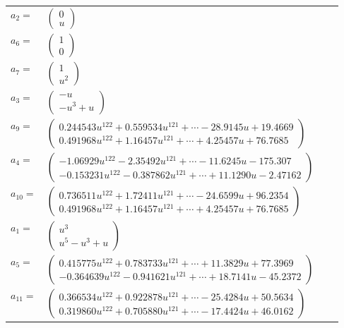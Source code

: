 \documentclass[1p]{elsarticle_modified}
\theoremstyle{definition}
\begin{document}
\begin{tabular}{m{7pt} m{180pt} m{7pt} m{180pt} }
\flushright $a_{2}=$&$\begin{pmatrix}0\\u\end{pmatrix}$ \\
\flushright $a_{6}=$&$\begin{pmatrix}1\\0\end{pmatrix}$ \\
\flushright $a_{7}=$&$\begin{pmatrix}1\\u^2\end{pmatrix}$ \\
\flushright $a_{3}=$&$\begin{pmatrix}- u\\- u^3+u\end{pmatrix}$ \\
\flushright $a_{9}=$&$\begin{pmatrix}0.244543 u^{122}+0.559534 u^{121}+\cdots-28.9145 u+19.4669\\0.491968 u^{122}+1.16457 u^{121}+\cdots+4.25457 u+76.7685\end{pmatrix}$ \\
\flushright $a_{4}=$&$\begin{pmatrix}-1.06929 u^{122}-2.35492 u^{121}+\cdots-11.6245 u-175.307\\-0.153231 u^{122}-0.387862 u^{121}+\cdots+11.1290 u-2.47162\end{pmatrix}$ \\
\flushright $a_{10}=$&$\begin{pmatrix}0.736511 u^{122}+1.72411 u^{121}+\cdots-24.6599 u+96.2354\\0.491968 u^{122}+1.16457 u^{121}+\cdots+4.25457 u+76.7685\end{pmatrix}$ \\
\flushright $a_{1}=$&$\begin{pmatrix}u^3\\u^5- u^3+u\end{pmatrix}$ \\
\flushright $a_{5}=$&$\begin{pmatrix}0.415775 u^{122}+0.783733 u^{121}+\cdots+11.3829 u+77.3969\\-0.364639 u^{122}-0.941621 u^{121}+\cdots+18.7141 u-45.2372\end{pmatrix}$ \\
\flushright $a_{11}=$&$\begin{pmatrix}0.366534 u^{122}+0.922878 u^{121}+\cdots-25.4284 u+50.5634\\0.319860 u^{122}+0.705880 u^{121}+\cdots-17.4424 u+46.0162\end{pmatrix}$ \\

\end{tabular}
\end{document}
